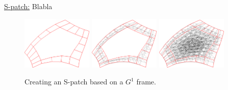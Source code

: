 \documentclass{article}
\begin{document}
\vspace{10pt}
\noindent\underline{S-patch:}\vspace{0.2em}\newline
Blabla
\begin{figure}[h!]
  \label{fig:rotations}
  \centering
  \includegraphics[width = 0.3\textwidth]{images/5-5-bezier-ribbon.png}
  \hfill
  \includegraphics[width = 0.3\textwidth]{images/5-5-cnet-ribbon.png}
  \hfill
  \includegraphics[width = 0.3\textwidth]{images/5-5-cnet-full.png}
  \caption{Creating an S-patch based on a $G^1$ frame.}
\end{figure}
\end{document}
